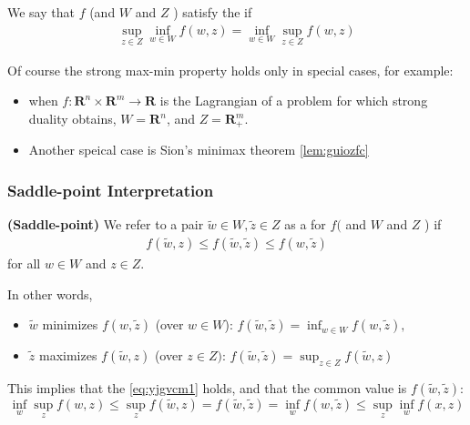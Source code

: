 \documentclass{article}
\newcommand{\bfs}[1]{\textbf{({#1}) }}
\begin{document}

We say that $f$ (and $W$ and $Z$ ) satisfy the  if 
\begin{align}
\sup _{z \in Z} \inf _{w \in W} f(w, z)=\inf _{w \in W} \sup _{z \in Z} f(w, z)\label{eq:yjgvcm1}
\end{align}

Of course the strong max-min property holds only in special cases, for example:
\begin{itemize}
    \item when $f: \mathbf{R}^{n} \times \mathbf{R}^{m} \rightarrow \mathbf{R}$ is the Lagrangian of a problem for which strong duality obtains, $W=\mathbf{R}^{n}$, and $Z=\mathbf{R}_{+}^{m}$. 
    \item Another speical case is Sion's minimax theorem \cref{lem:guiozfc}
\end{itemize}
\subsubsection{Saddle-point Interpretation}
\begin{defa}\bfs{Saddle-point}
We refer to a pair $\tilde{w} \in W, \tilde{z} \in Z$ as a  for $f($ and $W$ and $Z$ ) if
\begin{align*}
f(\tilde{w}, z) \leq f(\tilde{w}, \tilde{z}) \leq f(w, \tilde{z})
\end{align*}
for all $w \in W$ and $z \in Z$. 

In other words, 
\begin{itemize}
    \item $\tilde{w}$ minimizes $f(w, \tilde{z})$ (over $w \in W$): $f(\tilde{w}, \tilde{z})=\inf _{w \in W} f(w, \tilde{z}),$
    \item $\tilde{z}$ maximizes $f(\tilde{w}, z)$ (over $z \in Z)$: $f(\tilde{w}, \tilde{z})=\sup _{z \in Z} f(\tilde{w}, z)$
\end{itemize}
\end{defa}


This implies that the  \cref{eq:yjgvcm1} holds, and that the common value is $f(\tilde{w}, \tilde{z})$:
$$\inf _{w} \sup _{z} f(w, z) \leq \sup _{z} f(\tilde{w}, z)=f(\tilde{w}, \tilde{z})=\inf _{w} f(w, \tilde{z}) \leq \sup _{z} \inf _{w} f(x, z)$$
\end{document}
